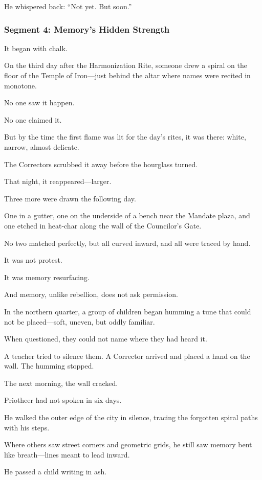 \documentclass[9pt]{article}
\begin{document}
He whispered back: “Not yet. But soon.”

\newpage

\subsubsection*{Segment 4: Memory's Hidden Strength}

It began with chalk.

On the third day after the Harmonization Rite, someone drew a spiral on the floor of the Temple of Iron—just behind the altar where names were recited in monotone. 

No one saw it happen. 

No one claimed it. 

But by the time the first flame was lit for the day’s rites, it was there: white, narrow, almost delicate.

The Correctors scrubbed it away before the hourglass turned.

That night, it reappeared—larger.

Three more were drawn the following day. 

One in a gutter, one on the underside of a bench near the Mandate plaza, and one etched in heat-char along the wall of the Councilor’s Gate. 

No two matched perfectly, but all curved inward, and all were traced by hand.

It was not protest. 

It was memory resurfacing. 

And memory, unlike rebellion, does not ask permission.

In the northern quarter, a group of children began humming a tune that could not be placed—soft, uneven, but oddly familiar. 

When questioned, they could not name where they had heard it. 

A teacher tried to silence them. A Corrector arrived and placed a hand on the wall. The humming stopped.

The next morning, the wall cracked.

Priotheer had not spoken in six days. 

He walked the outer edge of the city in silence, tracing the forgotten spiral paths with his steps. 

Where others saw street corners and geometric grids, he still saw memory bent like breath—lines meant to lead inward.

He passed a child writing in ash. 
\end{document}
